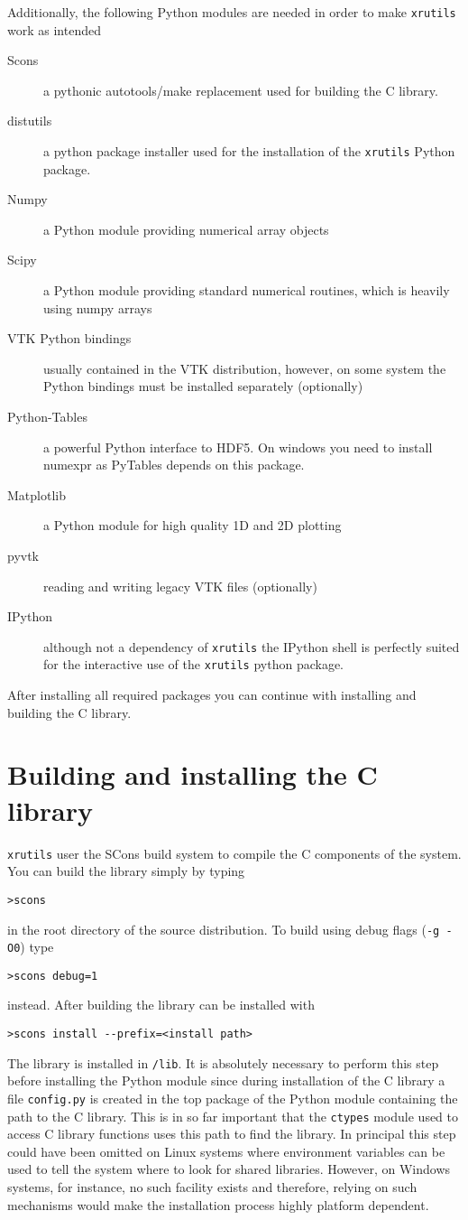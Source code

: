Additionally, the following Python modules are needed in order to make 
{\tt xrutils} work as intended
\begin{description}
\item[Scons] a pythonic autotools/make replacement used for building the C library.
\item[distutils] a python package installer used for the installation of the {\tt xrutils} Python package.
\item[Numpy] a Python module providing numerical array objects
\item[Scipy] a Python module providing standard numerical routines, which is heavily using numpy arrays
\item[VTK Python bindings] usually contained in the VTK distribution, however,
on some system the Python bindings must be installed separately (optionally)
\item[Python-Tables] a powerful Python interface to HDF5. On windows you need to install numexpr as PyTables depends on this package.
\item[Matplotlib] a Python module for high quality 1D and 2D plotting
\item[pyvtk] reading and writing legacy VTK files (optionally)
\item[IPython] although not a dependency of {\tt xrutils} the IPython shell is perfectly suited for the interactive use of the {\tt xrutils} python package.
\end{description}
After installing all required packages you can continue with installing and
building the C library.

\section{Building and installing the C library}

{\tt xrutils} user the SCons build system to compile the C components of the
system. You can build the library simply by typing 
\begin{verbatim}
>scons
\end{verbatim}
in the root directory of the source distribution. To build using debug flags ({\tt -g -O0}) type
\begin{verbatim}
>scons debug=1
\end{verbatim}
instead. After building the library can be installed with
\begin{verbatim}
>scons install --prefix=<install path>
\end{verbatim}
The library is installed in {\tt<install path>/lib}. It is absolutely necessary
to perform this step before installing the Python module since during
installation of the C library a file {\tt config.py} is created in the top
package of the Python module containing the path to the C library. This is in so
far important that the {\tt ctypes} module used to access C library functions
uses this path to find the library. In principal this step could have been
omitted on Linux systems where environment variables can be used to tell the
system where to look for shared libraries. However, on Windows systems, for
instance, no such facility exists and therefore, relying on such mechanisms
would make the installation process highly platform dependent. 

